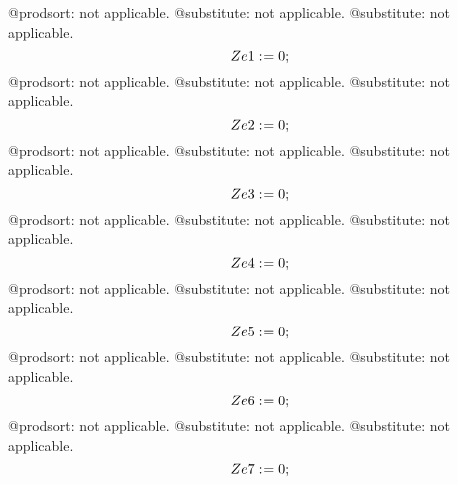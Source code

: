 \documentclass[11pt]{article}
\def\specialcolon{\mathrel{\mathop{:}}\hspace{-.5em}}
\begin{document}
@prodsort: not applicable.
@substitute: not applicable.
@substitute: not applicable.
\begin{dmath*}[compact, spread=2pt]
Ze1\specialcolon{}= 0;
\end{dmath*}
@prodsort: not applicable.
@substitute: not applicable.
@substitute: not applicable.
\begin{dmath*}[compact, spread=2pt]
Ze2\specialcolon{}= 0;
\end{dmath*}
@prodsort: not applicable.
@substitute: not applicable.
@substitute: not applicable.
\begin{dmath*}[compact, spread=2pt]
Ze3\specialcolon{}= 0;
\end{dmath*}
@prodsort: not applicable.
@substitute: not applicable.
@substitute: not applicable.
\begin{dmath*}[compact, spread=2pt]
Ze4\specialcolon{}= 0;
\end{dmath*}
@prodsort: not applicable.
@substitute: not applicable.
@substitute: not applicable.
\begin{dmath*}[compact, spread=2pt]
Ze5\specialcolon{}= 0;
\end{dmath*}
@prodsort: not applicable.
@substitute: not applicable.
@substitute: not applicable.
\begin{dmath*}[compact, spread=2pt]
Ze6\specialcolon{}= 0;
\end{dmath*}
@prodsort: not applicable.
@substitute: not applicable.
@substitute: not applicable.
\begin{dmath*}[compact, spread=2pt]
Ze7\specialcolon{}= 0;
\end{dmath*}
\end{document}
